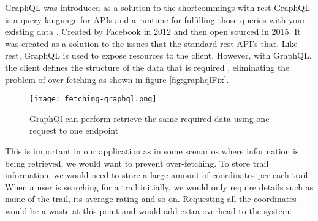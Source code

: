GraphQL was introduced as a solution to the shortcommings with \acrshort{rest} GraphQL is a query language for APIs and a runtime for fulfilling those queries with your existing data \cite{graphQl}. Created by Facebook in 2012 and then open sourced in 2015. It was created as a solution to the issues that the standard \acrshort{rest} API's that. Like \acrshort{rest}, GraphQL is used to expose resources to the client. However, with GraphQL, the client defines the structure of the data that is required \cite{howToGraphQl}, eliminating the problem of over-fetching as shown in figure \autoref{fig:graphqlFix}.

\begin{figure}[htb!]
    \centering
    \texttt{[image: fetching-graphql.png]}
    \caption{GraphQl can perform retrieve the same required data using one request to one endpoint \cite{graphqlSolution}}
    \label{fig:graphqlFix}
\end{figure}

This is important in our application as in some scenarios where information is being retrieved, we would want to prevent over-fetching. To store trail information, we would need to store a large amount of coordinates per each trail. When a user is searching for a trail initially, we would only require details such as name of the trail, its average rating and so on. Requesting all the coordinates would be a waste at this point and would add extra overhead to the system. 